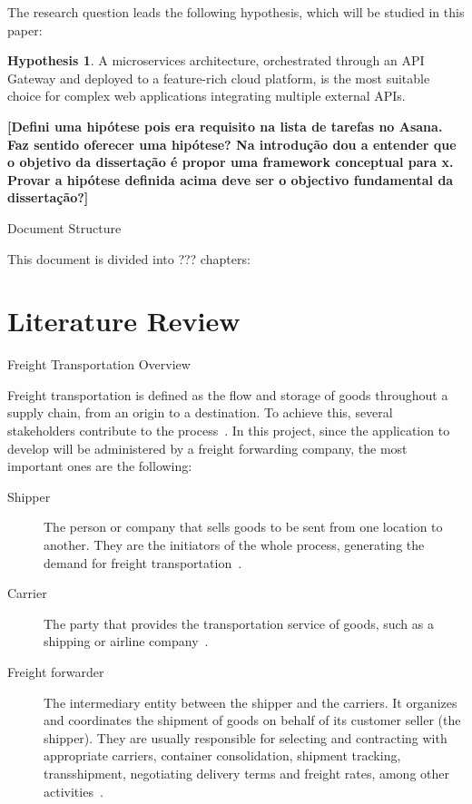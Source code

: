 \documentclass[12pt,reqno, oneside]{amsbook}
\makeatletter
\def\section{\@startsection{section}{1}%
      \z@{.5\linespacing\@plus.7\linespacing}{.25\linespacing}%
      {\normalfont\bfseries\flushleft}}
\theoremstyle{definition}
\theoremstyle{definition}
\newtheorem{hypothesis}{Hypothesis}
\numberwithin{section}{chapter}
\numberwithin{table}{chapter}
\numberwithin{figure}{chapter}
\makeatother
\begin{document}
The research question leads the following hypothesis, which will be studied in this paper:

\begin{hypothesis}
  A microservices architecture, orchestrated through an \ac{API} Gateway and deployed to a feature-rich cloud platform, is the most suitable choice for complex web applications integrating multiple external \acp{API}.
\end{hypothesis}

\textbf{[Defini uma hipótese pois era requisito na lista de tarefas no Asana. Faz sentido oferecer uma hipótese? Na introdução dou a entender que o objetivo da dissertação é propor uma framework conceptual para x. Provar a hipótese definida acima deve ser o objectivo fundamental da dissertação?]}

\section{Document Structure}
\label{Section:Document_Structure}

This document is divided into ??? chapters:

\chapter{Literature Review}
\label{Chapter:Literature_Review}

\section{Freight Transportation Overview}
\label{Section:Freight_Transportation_Overview}

Freight transportation is defined as the flow and storage of goods throughout a supply chain, from an origin to a destination. To achieve this, several stakeholders contribute to the process~\cite{Song2021, Huber2021}. In this project, since the application to develop will be administered by a freight forwarding company, the most important ones are the following:

\begin{description}
  \item [Shipper] The person or company that sells goods to be sent from one location to another. They are the initiators of the whole process, generating the demand for freight transportation~\cite{Song2021}.
  \item [Carrier] The party that provides the transportation service of goods, such as a shipping or airline company~\cite{Song2021}.
  \item [Freight forwarder] The intermediary entity between the shipper and the carriers. It organizes and coordinates the shipment of goods on behalf of its customer seller (the shipper). They are usually responsible for selecting and contracting with appropriate carriers, container consolidation, shipment tracking, transshipment, negotiating delivery terms and freight rates, among other activities~\cite{Song2021, Huang2019}.
\end{description}
\end{document}
